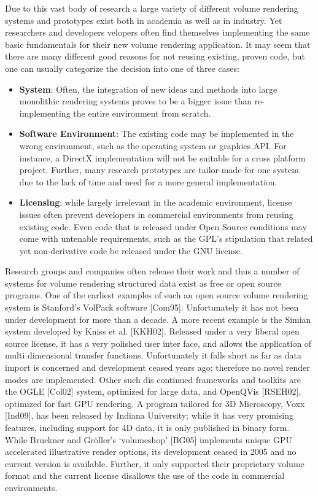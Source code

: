 Due to this vast body of research a large variety of different volume
rendering systems and prototypes exist both in academia as well as in
industry. Yet researchers and developers velopers often find themselves
implementing the same basic fundamentals for their new volume rendering
application. It may seem that there are many different good reasons for
not reusing existing, proven code, but one can usually categorize the
decision into one of three cases:

\begin{itemize}

  \item \textbf{System}:
	Often, the integration of new ideas and methods
	into large monolithic rendering systems proves to be a
	bigger issue than re-implementing the entire environment
	from scratch.

  \item \textbf{Software Environment}: The existing code may be
  implemented in the wrong environment, such as the operating system
  or graphics API. For instance, a DirectX implementation will not
  be suitable for a cross platform project. Further, many research
  prototypes are tailor-made for one system due to the lack of time and
  need for a more general implementation.

  \item \textbf{Licensing}: while largely irrelevant in the academic
  environment, license issues often prevent developers in commercial
  environments from reusing existing code. Even code that is released
  under Open Source conditions may come with untenable requirements,
  such as the GPL's stipulation that related yet non-derivative code be
  released under the GNU license.

\end{itemize}

Research groups and companies often release their work and thus a
number of systems for volume rendering structured data exist as free
or open source programs. One of the earliest examples of such an
open source volume rendering system is Stanford's VolPack software
[Com95]. Unfortunately it has not been under development for more
than a decade. A more recent example is the Simian system developed
by Kniss et al. [KKH02]. Released under a very liberal open source
license, it has a very polished user inter face, and allows the
application of multi dimensional transfer functions. Unfortunately it
falls short as far as data import is concerned and development ceased
years ago; therefore no novel render modes are implemented. Other such
dis continued frameworks and toolkits are the OGLE [Col02] system,
optimized for large data, and OpenQVis [RSEH02], optimized for fast GPU
rendering. A program tailored for 3D Microscopy, Voxx [Ind09], has been
released by Indiana University; while it has very promising features,
including support for 4D data, it is only published in binary form.
While Bruckner and Gr\"oller's `volumeshop' [BG05] implements unique GPU
accelerated illustrative render options, its development ceased in 2005
and no current version is available. Further, it only supported their
proprietary volume format and the current license disallows the use of
the code in commercial environments.

